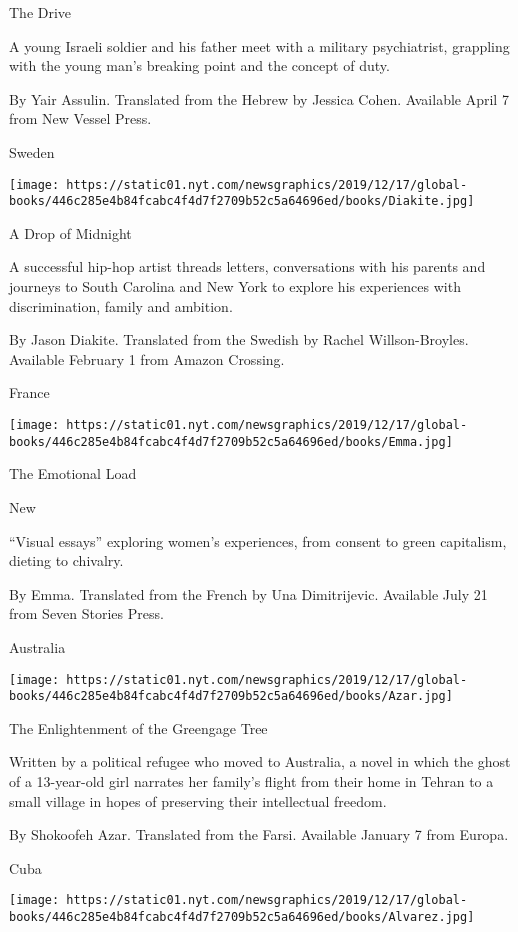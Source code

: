The Drive

A young Israeli soldier and his father meet with a military
psychiatrist, grappling with the young man's breaking point and the
concept of duty.

 By Yair Assulin. Translated from the Hebrew by Jessica Cohen. Available
April 7 from New Vessel Press.

Sweden

\texttt{[image: https://static01.nyt.com/newsgraphics/2019/12/17/global-books/446c285e4b84fcabc4f4d7f2709b52c5a64696ed/books/Diakite.jpg]}

A Drop of Midnight

A successful hip-hop artist threads letters, conversations with his
parents and journeys to South Carolina and New York to explore his
experiences with discrimination, family and ambition.

 By Jason Diakite. Translated from the Swedish by Rachel
Willson-Broyles. Available February 1 from Amazon Crossing.

France

\texttt{[image: https://static01.nyt.com/newsgraphics/2019/12/17/global-books/446c285e4b84fcabc4f4d7f2709b52c5a64696ed/books/Emma.jpg]}

The Emotional Load

New

``Visual essays'' exploring women's experiences, from consent to green
capitalism, dieting to chivalry.

 By Emma. Translated from the French by Una Dimitrijevic. Available July
21 from Seven Stories Press.

Australia

\texttt{[image: https://static01.nyt.com/newsgraphics/2019/12/17/global-books/446c285e4b84fcabc4f4d7f2709b52c5a64696ed/books/Azar.jpg]}

The Enlightenment of the Greengage Tree

Written by a political refugee who moved to Australia, a novel in which
the ghost of a 13-year-old girl narrates her family's flight from their
home in Tehran to a small village in hopes of preserving their
intellectual freedom.

 By Shokoofeh Azar. Translated from the Farsi. Available January 7 from
Europa.

Cuba

\texttt{[image: https://static01.nyt.com/newsgraphics/2019/12/17/global-books/446c285e4b84fcabc4f4d7f2709b52c5a64696ed/books/Alvarez.jpg]}

